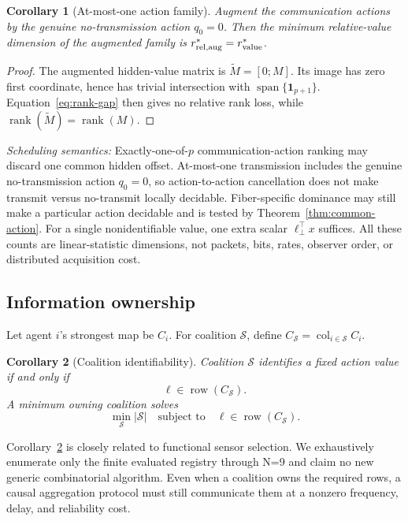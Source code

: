 \documentclass[10pt,twocolumn,twoside]{IEEEtran}
\newtheorem{corollary}{Corollary}
\DeclareMathOperator{\row}{row}
\DeclareMathOperator{\rank}{rank}
\DeclareMathOperator{\col}{col}
\begin{document}
\begin{corollary}[At-most-one action family]
\label{cor:at-most-one}
Augment the communication actions by the genuine no-transmission action
\(q_0=0\).  Then the minimum relative-value dimension of the augmented family
is \(r_{\rm rel,aug}^*=r_{\rm value}^*\).
\end{corollary}

\begin{proof}
The augmented hidden-value matrix is
\(\widetilde M=[0;M]\).  Its image has zero first coordinate, hence has
trivial intersection with
\(\operatorname{span}\{\mathbf1_{p+1}\}\).  Equation~\eqref{eq:rank-gap}
then gives no relative rank loss, while
\(\rank(\widetilde M)=\rank(M)\).
\end{proof}

\emph{Scheduling semantics:} Exactly-one-of-\(p\) communication-action ranking may discard one common hidden
offset.  At-most-one transmission includes the genuine no-transmission action
\(q_0=0\), so action-to-action cancellation does not make transmit versus
no-transmit locally decidable.  Fiber-specific dominance may still make a
particular action decidable and is tested by Theorem~\ref{thm:common-action}.
For a single nonidentifiable value, one extra scalar
\(\ell_\perp^\top x\) suffices.  All these counts are linear-statistic
dimensions, not packets, bits, rates, observer order, or distributed
acquisition cost.

\subsection{Information ownership}

Let agent \(i\)'s strongest map be \(C_i\).  For coalition \(\mathcal S\), define
\(C_{\mathcal S}=\col_{i\in\mathcal S}C_i\).

\begin{corollary}[Coalition identifiability]
\label{cor:coalition}
Coalition \(\mathcal S\) identifies a fixed action value if and only if
\begin{equation}
\ell\in\row(C_{\mathcal S}).
\end{equation}
A minimum owning coalition solves
\begin{equation}
\min_{\mathcal S}|\mathcal S|
\quad\text{subject to}\quad
\ell\in\row(C_{\mathcal S}).
\label{eq:coalition}
\end{equation}
\end{corollary}

Corollary~\ref{cor:coalition} is closely related to functional sensor
selection.  We exhaustively enumerate only the finite evaluated registry
through N=9 and claim no new generic combinatorial algorithm.
Even when a coalition owns the required rows, a causal aggregation protocol
must still communicate them at a nonzero frequency, delay, and reliability
cost.
\end{document}
